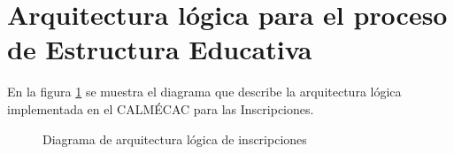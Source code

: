 \section{Arquitectura lógica para el proceso de Estructura Educativa}

En la figura \ref{fig:arquitecturaIN} se muestra el diagrama que describe la arquitectura lógica implementada en el CALMÉCAC para las Inscripciones.\\


\begin{figure}[htbp]
	\begin{center}
		\caption{Diagrama de arquitectura lógica de inscripciones}
		\label{fig:arquitecturaIN}
	\end{center}
\end{figure}

